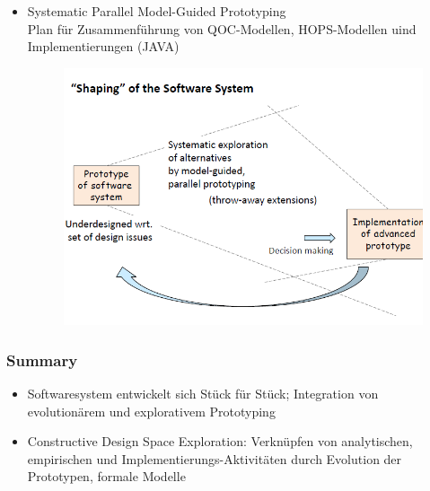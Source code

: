 \begin{itemize}
	\item Systematic Parallel Model-Guided Prototyping\\
	Plan für Zusammenführung von QOC-Modellen, HOPS-Modellen uind Implementierungen (JAVA)
	\begin{figure}[!h]
		\centering
		\includegraphics[scale=0.7]{img/shaping_system.png}
	\end{figure}
\end{itemize}

\newpage
\subsubsection{Summary}
\begin{itemize}
	\item Softwaresystem entwickelt sich Stück für Stück; Integration von evolutionärem und explorativem Prototyping
	
	\item Constructive Design Space Exploration: Verknüpfen von analytischen, empirischen und Implementierungs-Aktivitäten durch Evolution der Prototypen, formale Modelle
\end{itemize}


